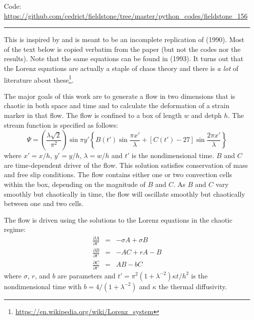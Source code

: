 \begin{center}
\inpython
{\small Code: \url{https://github.com/cedrict/fieldstone/tree/master/python_codes/fieldstone_156}}
\end{center}

\par\noindent\rule{\textwidth}{0.4pt}


This \stone is inspired by and is meant to be an incomplete 
replication of \textcite{ketu90} (1990). Most of the text
below is copied verbatim from the paper (but not the codes nor the results).
Note that the same equations can be found in \textcite{kell93} (1993).
It turns out that the Lorenz equations are actually a staple of chaos theory and there 
is {\it a lot} of literature about these\footnote{\url{https://en.wikipedia.org/wiki/Lorenz_system}}.

The major goals of this work are to generate a flow in two
dimensions that is chaotic in both space and time and
to calculate the deformation of a strain marker in that flow.
The flow is confined to a box of length $w$ and detph $h$.
The stream function is specified as follows:
\begin{equation}
\Psi = 
\left(
\frac{\lambda \sqrt 2}{\pi^2}
\right)
\sin \pi y'
\left\{
B(t') \sin \frac{\pi x'}{\lambda}
+[C(t')-27]\sin \frac{2 \pi x'}{\lambda}
\right\}
\label{eq:ketupsi}
\end{equation}
where $x'=x/h$, $y'=y/h$, $\lambda=w/h$ and $t'$ is the nondimensional
time. 
$B$ and $C$ are time-dependent driver of the flow. This solution satisfies 
conservation of mass and free slip conditions. 
The flow contains either one or two convection cells within the box,
depending on the magnitude of $B$ and $C$.
As $B$ and $C$ vary smoothly but chaotically in time, the flow will oscillate
smoothly but chaotically between one and two cells. 

The flow is driven using the solutions to the Lorenz equations in the chaotic regime:
\begin{eqnarray}
\frac{\partial A}{\partial t'} &=& -\sigma A + \sigma B \label{eq:Lorenz1}\\ 
\frac{\partial B}{\partial t'} &=& -AC + rA -B \label{eq:Lorenz2}\\ 
\frac{\partial C}{\partial t'} &=& AB - bC \label{eq:Lorenz3}
\end{eqnarray}
where $\sigma$, $r$, and $b$ are parameters and $t'=\pi^2 (1+\lambda^{-2}) \kappa t /h^2$
is the nondimensional time with $b=4/(1+\lambda^{-2})$ and $\kappa$ the thermal diffusivity. 

